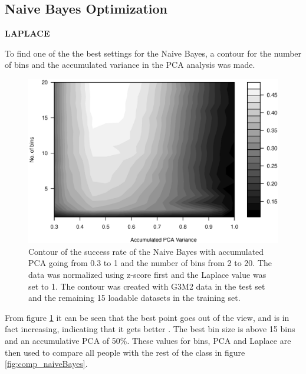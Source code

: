 \subsection{Naive Bayes Optimization}
\textbf{LAPLACE}

To find one of the the best settings for the Naive Bayes, a contour for the number of bins and the accumulated variance in the PCA analysis was made.

\begin{figure}[H]
\centering
\includegraphics[width = \textwidth]{graphics/contour_bins_vs_pca}
\caption{Contour of the success rate of the Naive Bayes with accumulated PCA going from 0.3 to 1 and the number of bins from 2 to 20.
The data was normalized using z-score first and the Laplace value was set to 1.
The contour was created with G3M2 data in the test set and the remaining 15 loadable datasets in the training set.}
\label{fig:contour_bin-vs-pca}
\end{figure}

From figure \ref{fig:contour_bin-vs-pca} it can be seen that the best point goes out of the view, and is in fact increasing, indicating that it gets better . The best bin size is above 15 bins and an accumulative PCA of 50\%.
These values for bins, PCA and Laplace are then used to compare all people with the rest of the class in figure \ref{fig:comp_naiveBayes}.


